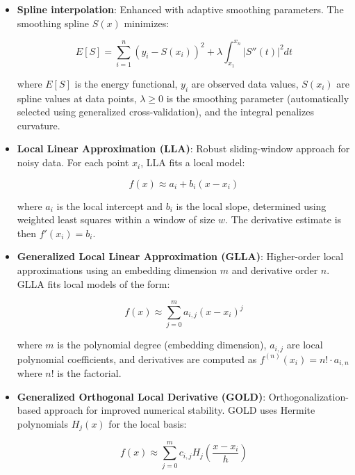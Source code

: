 \documentclass[10pt,journal,compsoc]{IEEEtran}
\begin{document}
\begin{itemize}
    \item \textbf{Spline interpolation}: Enhanced with adaptive smoothing parameters. The smoothing spline $S(x)$ minimizes:
    
    \begin{equation}
        E[S] = \sum_{i=1}^{n} \left(y_i - S(x_i)\right)^2 + \lambda \int_{x_1}^{x_n} \left|S''(t)\right|^2 dt
    \end{equation}
    
    where $E[S]$ is the energy functional, $y_i$ are observed data values, $S(x_i)$ are spline values at data points, $\lambda \geq 0$ is the smoothing parameter (automatically selected using generalized cross-validation), and the integral penalizes curvature.
    
    \item \textbf{Local Linear Approximation (LLA)}: Robust sliding-window approach for noisy data. For each point $x_i$, LLA fits a local model:
    
    \begin{equation}
        f(x) \approx a_i + b_i(x - x_i)
    \end{equation}
    
    where $a_i$ is the local intercept and $b_i$ is the local slope, determined using weighted least squares within a window of size $w$. The derivative estimate is then $f'(x_i) = b_i$.
    
    \item \textbf{Generalized Local Linear Approximation (GLLA)}: Higher-order local approximations using an embedding dimension $m$ and derivative order $n$. GLLA fits local models of the form:
    
    \begin{equation}
        f(x) \approx \sum_{j=0}^{m} a_{i,j}(x - x_i)^j
    \end{equation}
    
    where $m$ is the polynomial degree (embedding dimension), $a_{i,j}$ are local polynomial coefficients, and derivatives are computed as $f^{(n)}(x_i) = n! \cdot a_{i,n}$ where $n!$ is the factorial.
    
    \item \textbf{Generalized Orthogonal Local Derivative (GOLD)}: Orthogonalization-based approach for improved numerical stability. GOLD uses Hermite polynomials $H_j(x)$ for the local basis:
    
    \begin{equation}
        f(x) \approx \sum_{j=0}^{m} c_{i,j}H_j\left(\frac{x - x_i}{h}\right)
    \end{equation}
    

\end{itemize}
\end{document}
